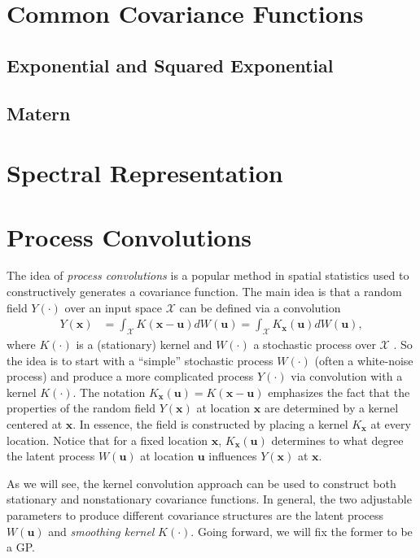 \documentclass[12pt]{article}
\newcommand{\Ker}{K}
\newcommand{\locSpace}{\mathcal{X}}
\newcommand{\loc}{\mathbf{x}}
\newcommand{\locDum}{\mathbf{u}}
\newcommand{\rf}{Y}
\begin{document}
\section{Common Covariance Functions}

\subsection{Exponential and Squared Exponential}

\subsection{Matern}


\section{Spectral Representation}

\section{Process Convolutions}
The idea of \textit{process convolutions} is a popular method in spatial statistics used to constructively generates a covariance function. The main idea is that a random field $\rf(\cdot)$ over an input space 
$\locSpace$ can be defined via a convolution 
\begin{align}
\rf(\loc) &= \int_{\locSpace} \Ker(\loc - \locDum) dW(\locDum) =  \int_{\locSpace} \Ker_{\loc}(\locDum) dW(\locDum), \label{process_convolution}
\end{align}
where $\Ker(\cdot)$ is a (stationary) kernel and $W(\cdot)$ a stochastic process over $\locSpace$ \cite{Risser}. So the idea is to start with a ``simple'' stochastic process $W(\cdot)$ (often a white-noise process) and produce a 
more complicated process $\rf(\cdot)$ via convolution with a kernel $\Ker(\cdot)$. The notation $\Ker_{\loc}(\locDum) = \Ker(\loc - \locDum)$ emphasizes the fact that the properties of the random field $\rf(\loc)$ at location 
$\loc$ are determined by a kernel centered at $\loc$. In essence, the field is constructed by placing a kernel $\Ker_{\loc}$ at every location. Notice that for a fixed location $\loc$, $\Ker_{\loc}(\locDum)$ determines to what degree
the latent process $W(\locDum)$ at location $\locDum$ influences $\rf(\loc)$ at $\loc$. 

As we will see, the kernel convolution approach can be used to construct both stationary and nonstationary covariance functions. In general, the two adjustable parameters to produce different 
covariance structures are the latent process $W(\locDum)$ and \textit{smoothing kernel} $\Ker(\cdot)$. Going forward, we will fix the former to be a GP. 
\end{document}

